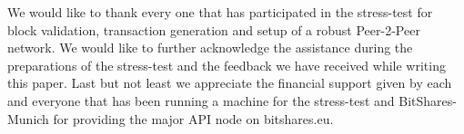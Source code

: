We would like to thank every one that has participated in the
stress-test for block validation, transaction generation and setup of a
robust Peer-2-Peer network. We would like to further acknowledge the
assistance during the preparations of the stress-test and the feedback
we have received while writing this paper. Last but not least we
appreciate the financial support given by each and everyone that has
been running a machine for the stress-test and BitShares-Munich for
providing the major API node on bitshares.eu.
